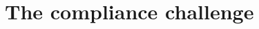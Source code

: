 \documentclass[../main.tex]{subfiles}
\begin{document}
\chapter{The compliance challenge}
\end{document}
